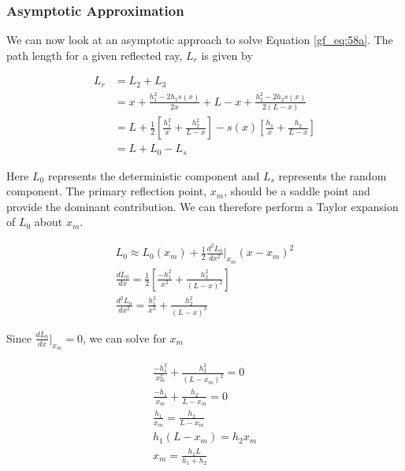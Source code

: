 \subsubsection{Asymptotic Approximation}
We can now look at an asymptotic approach to solve Equation \ref{gf_eq:58a}. The path length for a given reflected ray, $L_r$ is given by

\begin{equation}
\begin{aligned}
L_r &= L_2 + L_3 \\
& = x + \frac{h_1^2-2h_1s(x)}{2x} +  L-x + \frac{h_2^2 - 2h_2s(x)}{2\left(L-x\right)} \\
& = L + \frac{1}{2}\left[\frac{h_1^2}{x} + \frac{h_2^2}{L-x} \right] - s(x)\left[ \frac{h_1}{x} + \frac{h_2}{L-x}\right] \\
&= L + L_0 - L_s
\end{aligned}
\label{gf_eq:60}
\end{equation}
\renewcommand{\baselinestretch}{2} \small\normalsize

Here $L_0$ represents the deterministic component and $L_s$ represents the random component. The primary reflection point, $x_m$, should be a saddle point and provide the dominant contribution. We can therefore perform a Taylor expansion of $L_0$ about $x_m$.

\begin{equation}
\begin{gathered}
\label{gf_eq:61}
L_0 \approx L_0(x_m) + \frac{1}{2}\frac{d^2L_0}{dx^2}\bigg|_{x_m}(x-x_m)^2 \\
\frac{dL_0}{dx} = \frac{1}{2}\left[\frac{-h_1^2}{x^2} + \frac{h_2^2}{(L-x)^2} \right]\\
\frac{d^2L_0}{dx^2} = \frac{h_1^2}{x^3} + \frac{h_2^2}{(L-x)^3} 
\end{gathered}
\end{equation}
\renewcommand{\baselinestretch}{2} \small\normalsize

\noindent Since $\frac{dL_0}{dx}\big|_{x_m} = 0$, we can solve for $x_m$

\begin{equation}
\begin{gathered}
\frac{-h_1^2}{x_m^2} + \frac{h_2^2}{(L-x_m)^2} = 0\\
\frac{-h_1}{x_m} + \frac{h_2}{L-x_m} = 0\\
\frac{h_1}{x_m} = \frac{h_2}{L-x_m}\\
h_1(L-x_m) = h_2x_m\\
x_m = \frac{h_1L}{h_1+h_2}
\end{gathered}
\label{gf_eq:64}
\end{equation}
\renewcommand{\baselinestretch}{2} \small\normalsize

